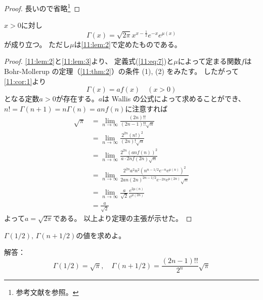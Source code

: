 \documentclass[report]{jlreq}
\begin{document}
\begin{proof}
    長いので省略\footnote{
        参考文献\cite[第IV章 定理15.6系]{杉浦80}を参照。
    }
\end{proof}

    \begin{theorem}
        $x > 0$に対し
        \begin{equation}
            \Gamma(x) = \sqrt{2\pi} x^{x - \frac{1}{2}} e^{-x} e^{\mu(x)}
        \end{equation}
        が成り立つ。
        ただし$\mu$は\cref{11:lem:2}で定めたものである。
    \end{theorem}

\begin{proof}
    \cref{11:lem:2}と\cref{11:lem:3}より、
    定義式(\ref{11:eq:7})と$\mu$によって定まる関数$f$は
    Bohr-Mollerup の定理（\cref{11:thm:2}）の条件 (1), (2) をみたす。
    したがって\cref{11:cor:1}より
    \begin{equation}
        \Gamma(x) = a f(x) \quad (x > 0)
    \end{equation}
    となる定数$a > 0$が存在する。$a$は Wallis の公式によって求めることができ、
    $n! = \Gamma(n+1) = n\Gamma(n) = anf(n)$に注意すれば
    \begin{equation}
        \begin{split}
            \sqrt{\pi}
                &= \lim_{n \to \infty} \frac{(2n)!!}{(2n - 1)!! \sqrt{n}} \\
                &= \lim_{n \to \infty} \frac{2^{2n} (n!)^2}{(2n)! \sqrt{n}} \\
                &= \lim_{n \to \infty} \frac{2^{2n} (an f(n))^2}{a \cdot 2n f(2n) \sqrt{n}} \\
                &= \lim_{n \to \infty} \frac{2^{2n} a^2 n^2 \left(n^{n-1/2} e^{-n} e^{\mu(n)}\right)^2}
                    {2 an (2n)^{2n-1/2} e^{-2n} e^{\mu(2n)} \sqrt{n}} \\
                &= \lim_{n \to \infty} \frac{a}{\sqrt{2}} \frac{e^{2\mu(n)}}{e^{\mu(2n)}} \\
                &= \frac{a}{\sqrt{2}}
        \end{split}
    \end{equation}
    よって$a = \sqrt{2\pi}$である。
    以上より定理の主張が示せた。
\end{proof}



\begin{problem}
    $\Gamma(1/2),\, \Gamma(n + 1/2)$の値を求めよ。

    解答：
    \begin{equation}
        \Gamma(1/2) = \sqrt{\pi},\quad \Gamma(n + 1/2) = \frac{(2n - 1)!!}{2^n} \sqrt{\pi}
    \end{equation}
\end{problem}
\end{document}
